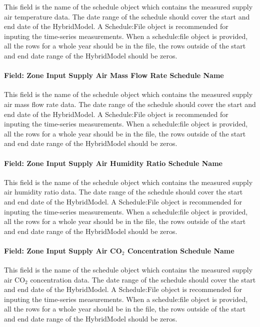 This field is the name of the schedule object which contains the measured supply air temperature data. The date range of the schedule should cover the start and end date of the HybridModel. A Schedule:File object is recommended for inputing the time-series measurements. When a schedule:file object is provided, all the rows for a whole year should be in the file, the rows outside of the start and end date range of the HybridModel should be zeros.

\paragraph{Field: Zone Input Supply Air Mass Flow Rate Schedule Name}\label{field-zone-input-supply-air-mass-flow-rate-schedule-name-hm}

This field is the name of the schedule object which contains the measured supply air mass flow rate data. The date range of the schedule should cover the start and end date of the HybridModel. A Schedule:File object is recommended for inputing the time-series measurements. When a schedule:file object is provided, all the rows for a whole year should be in the file, the rows outside of the start and end date range of the HybridModel should be zeros.

\paragraph{Field: Zone Input Supply Air Humidity Ratio Schedule Name}\label{field-zone-input-supply-air-humidity-ratio-schedule-name-hm}

This field is the name of the schedule object which contains the measured supply air humidity ratio data. The date range of the schedule should cover the start and end date of the HybridModel. A Schedule:File object is recommended for inputing the time-series measurements. When a schedule:file object is provided, all the rows for a whole year should be in the file, the rows outside of the start and end date range of the HybridModel should be zeros.

\paragraph{Field: Zone Input Supply Air CO$_2$ Concentration Schedule Name}\label{field-zone-input-supply-air-co2-concentration-schedule-name-hm}

This field is the name of the schedule object which contains the measured supply air CO$_2$ concentration data. The date range of the schedule should cover the start and end date of the HybridModel. A Schedule:File object is recommended for inputing the time-series measurements. When a schedule:file object is provided, all the rows for a whole year should be in the file, the rows outside of the start and end date range of the HybridModel should be zeros.

